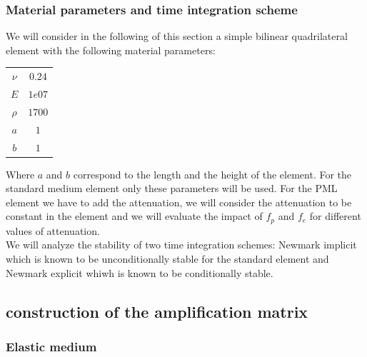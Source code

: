 \subsubsection{Material parameters and time integration scheme}
We will consider in the following of this section a simple bilinear quadrilateral element with the following material parameters:
\begin{table}[H]
\centering
\begin{tabular}{c|c}
$\nu$ & $0.24$ \\
$E$ & $1e07$ \\
$\rho$ & $1700$ \\
$a$ & $1$ \\
$b$ & $1$
\end{tabular}
\end{table} 
Where $a$ and $b$ correspond to the length and the height of the element.
For the standard medium element only these parameters will be used. For the PML element we have to add the attenuation, we will consider the attenuation to be constant in the element and we will evaluate the impact of $f_p$ and $f_e$ for different values of attenuation.\\
We will analyze the stability of two time integration schemes: Newmark implicit which is known to be unconditionally stable for the standard element and Newmark explicit whiwh is known to be conditionally stable. 
\subsection{construction of the amplification matrix}
\subsubsection{Elastic medium}
